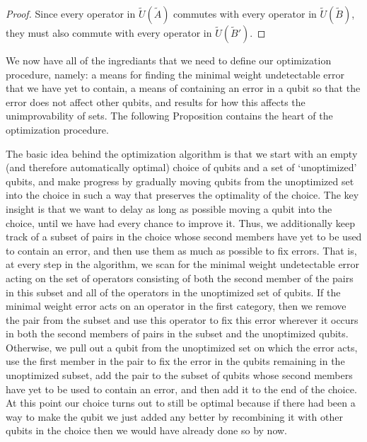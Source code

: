 \documentclass[twocolumn,showpacs,preprintnumbers,amsmath,amssymb,nofootinbib,pra,floatfix]{revtex4-1}
\newenvironment{remark}[1][Remark]{\begin{trivlist}
\item[\hskip \labelsep {\bfseries #1}]}{\end{trivlist}}
\newcommand{\set}{\tilde}
\begin{document}
\begin{proof}
Since every operator in $\set U(\set A)$ commutes with every operator in $\set U(\set B)$, they must also commute with every operator in $\set U(\set B')$.
\end{proof}
\begin{remark}
We now have all of the ingrediants that we need to define our optimization procedure, namely: a means for finding the minimal weight undetectable error that we have yet to contain, a means of containing an error in a qubit so that the error does not affect other qubits, and results for how this affects the unimprovability of sets.  The following Proposition contains the heart of the optimization procedure.

The basic idea behind the optimization algorithm is that we start with an empty (and therefore automatically optimal) choice of qubits and a set of `unoptimized' qubits, and make progress by gradually moving qubits from the unoptimized set into the choice in such a way that preserves the optimality of the choice.  The key insight is that we want to delay as long as possible moving a qubit into the choice, until we have had every chance to improve it.  Thus, we additionally keep track of a subset of pairs in the choice whose second members have yet to be used to contain an error, and then use them as much as possible to fix errors.  That is, at every step in the algorithm, we scan for the minimal weight undetectable error acting on the set of operators consisting of both the second member of the pairs in this subset and all of the operators in the unoptimized set of qubits.  If the minimal weight error acts on an operator in the first category, then we remove the pair from the subset and use this operator to fix this error wherever it occurs in both the second members of pairs in the subset and the unoptimized qubits.  Otherwise, we pull out a qubit from the unoptimized set on which the error acts, use the first member in the pair to fix the error in the qubits remaining in the unoptimized subset, add the pair to the subset of qubits whose second members have yet to be used to contain an error, and then add it to the end of the choice.  At this point our choice turns out to still be optimal because if there had been a way to make the qubit we just added any better by recombining it with other qubits in the choice then we would have already done so by now.


\end{remark}
\end{document}

